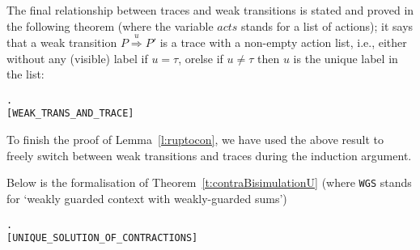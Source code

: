 The final relationship between traces and weak transitions is stated
and proved in the following theorem
(where the  variable $acts$ stands for
a list of actions); 
it says that a
 weak transition $P\overset{u}{\Rightarrow}P'$ is a  trace with a
 non-empty 
action list, i.e., either without any (visible) label if $u = \tau$, orelse 
if $u \neq \tau$ then $u$ is the unique label in the list: 
\begin{alltt}
\HOLTokenTurnstile{}  \HOLTokenWeakTransBegin{}\HOLTokenWeakTransEnd {} \HOLSymConst{\HOLTokenEquiv{}}
   \HOLSymConst{\HOLTokenExists{}}.
           \HOLSymConst{\HOLTokenConj{}} \HOLSymConst{\HOLTokenNeg{}}  \HOLSymConst{\HOLTokenConj{}}
         \HOLSymConst{=} \HOLSymConst{\ensuremath{\tau}}       \hfill{[WEAK_TRANS_AND_TRACE]}
\end{alltt}


To finish the proof of Lemma~\ref{l:ruptocon}, we have used the  above
result to freely switch between weak transitions and traces
during the induction argument.



Below is the formalisation of
Theorem~\ref{t:contraBisimulationU} (where \texttt{WGS} stands for
`weakly guarded context with weakly-guarded sums')
\begin{alltt}
\HOLTokenTurnstile{}   \HOLSymConst{\HOLTokenImp{}} \HOLSymConst{\HOLTokenForall{}} .  \HOLSymConst{\HOLTokenContracts{}}   \HOLSymConst{\HOLTokenConj{}}  \HOLSymConst{\HOLTokenContracts{}}   \HOLSymConst{\HOLTokenImp{}}  \HOLSymConst{\HOLTokenWeakEQ} 
\hfill{[UNIQUE_SOLUTION_OF_CONTRACTIONS]}
\end{alltt}


